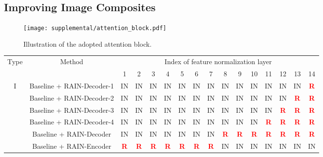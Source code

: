 \documentclass[final]{cvpr}
\begin{document}
\subsection{Improving Image Composites}
\label{subsec:improving_composite}


\begin{figure}[!htbp]
\begin{center}
\texttt{[image: supplemental/attention\_block.pdf]}\\
\end{center}
   \caption{Illustration of the adopted attention block. }
\label{fig:attention_block}
\end{figure}

\begin{table*}[!tp]
\small
\begin{center}
\begin{tabular}{|c|c|c|c|c|c|c|c|c|c|c|c|c|c|c|c|}
\hline
\multirow{2}{*}{Type} & \multirow{2}{*}{Method} & \multicolumn{14}{c|}{Index of feature normalization layer} \\
\cline{3-16}
& & 1 & 2 & 3 & 4 & 5 & 6 & 7 & 8 & 9 & 10 & 11 & 12 & 13 & 14 \\
\hline
\multirow{6}{*}{I}& Baseline + RAIN-Decoder-1 & IN & IN & IN & IN & IN & IN & IN & IN & IN & IN & IN & IN & IN & \textcolor{red}{\textbf{R}} \\
& Baseline + RAIN-Decoder-2 & IN & IN & IN & IN & IN & IN & IN & IN & IN & IN & IN & IN & \textcolor{red}{\textbf{R}} & \textcolor{red}{\textbf{R}} \\
& Baseline + RAIN-Decoder-3 & IN & IN & IN & IN & IN & IN & IN & IN & IN & IN & IN & \textcolor{red}{\textbf{R}} & \textcolor{red}{\textbf{R}} & \textcolor{red}{\textbf{R}} \\
& Baseline + RAIN-Decoder-4 & IN & IN & IN & IN & IN & IN & IN & IN & IN & IN & \textcolor{red}{\textbf{R}} & \textcolor{red}{\textbf{R}} & \textcolor{red}{\textbf{R}} & \textcolor{red}{\textbf{R}} \\
& Baseline + RAIN-Decoder & IN & IN & IN & IN & IN & IN & IN & \textcolor{red}{\textbf{R}} & \textcolor{red}{\textbf{R}} & \textcolor{red}{\textbf{R}} & \textcolor{red}{\textbf{R}} & \textcolor{red}{\textbf{R}} & \textcolor{red}{\textbf{R}} & \textcolor{red}{\textbf{R}} \\
& Baseline + RAIN-Encoder & \textcolor{red}{\textbf{R}} & \textcolor{red}{\textbf{R}} & \textcolor{red}{\textbf{R}} & \textcolor{red}{\textbf{R}} & \textcolor{red}{\textbf{R}} & \textcolor{red}{\textbf{R}} & \textcolor{red}{\textbf{R}} & IN & IN & IN & IN & IN & IN & IN\\

\end{tabular}
\end{center}
\end{table*}
\end{document}
